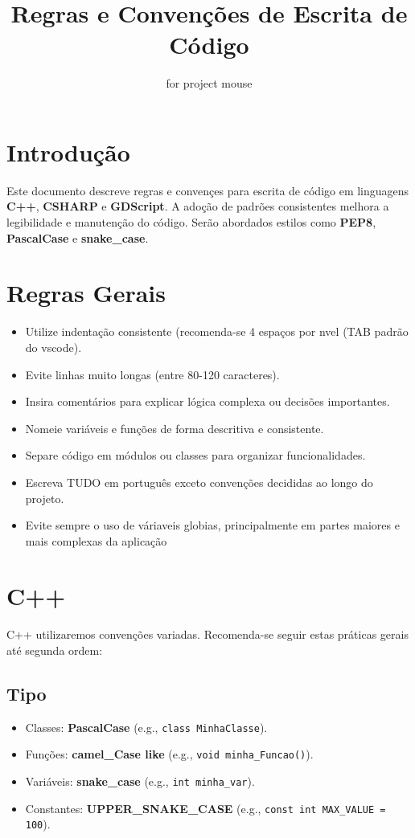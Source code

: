 \documentclass[12pt,a4paper]{article}
\title{Regras e Convenções de Escrita de Código}
\author{for project mouse}
\begin{document}
\maketitle

\section*{Introdução}
Este documento descreve regras e convençes para escrita de código em linguagens \textbf{C++}, \textbf{CSHARP} e \textbf{GDScript}. A adoção de padrões consistentes melhora a legibilidade e manutenção do código. Serão abordados estilos como \textbf{PEP8}, \textbf{PascalCase} e \textbf{snake\_case}.

\section{Regras Gerais}
\begin{itemize}
    \item Utilize indentação consistente (recomenda-se 4 espaços por nvel (TAB padrão do vscode).
    \item Evite linhas muito longas (entre 80-120 caracteres).
    \item Insira comentários para explicar lógica complexa ou decisões importantes.
    \item Nomeie variáveis e funções de forma descritiva e consistente.
    \item Separe código em módulos ou classes para organizar funcionalidades.
    \item Escreva TUDO em português exceto convenções decididas ao longo do projeto.
    \item Evite sempre o uso de váriaveis globias, principalmente em partes maiores e mais complexas da aplicação
\end{itemize}

\section{C++}
C++ utilizaremos convenções variadas. Recomenda-se seguir estas práticas gerais até segunda ordem:
\subsection*{Tipo}
\begin{itemize}
    \item Classes: \textbf{PascalCase} (e.g., \lstinline|class MinhaClasse|).
    \item Funções: \textbf{camel\_Case like} (e.g., \lstinline|void minha_Funcao()|).
    \item Variáveis: \textbf{snake\_case} (e.g., \lstinline|int minha_var|).
    \item Constantes: \textbf{UPPER\_SNAKE\_CASE} (e.g., \lstinline|const int MAX_VALUE = 100|).
\end{itemize}
\end{document}
